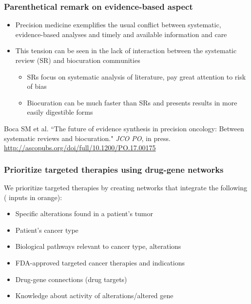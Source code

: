 \documentclass{beamer}
\begin{document}
\begin{frame}[noframenumbering]
\frametitle{Parenthetical remark on evidence-based aspect}

\begin{itemize}
\item Precision medicine exemplifies the usual conflict between systematic, evidence-based analyses and
timely and available information and care
\item This tension can be seen in the lack of interaction between the systematic review (SR) and biocuration communities
\begin{itemize}
\item SRs focus on systematic analysis of literature, pay great attention to risk of bias
\item Biocuration can be much faster than SRs and presents results in more easily digestible forms
\end{itemize}
\end{itemize}

\vspace{0.4cm}

Boca SM et al. ``The future of evidence synthesis in precision oncology: Between systematic reviews and biocuration."
\textit{JCO PO}, in press. \url{http://ascopubs.org/doi/full/10.1200/PO.17.00175}

\end{frame}


\begin{frame}[noframenumbering]
\frametitle{Prioritize targeted therapies using drug-gene networks}

We prioritize targeted therapies by creating networks that integrate the following ({\color{orange} inputs in orange}):

\begin{itemize}
\item {\color{orange}Specific alterations found in a patient's tumor}
\item {\color{orange}Patient's cancer type}
\item Biological pathways relevant to cancer type, alterations
\item FDA-approved targeted cancer therapies and indications
\item Drug-gene connections (drug targets)
\item Knowledge about activity of alterations/altered gene
\end{itemize}

\end{frame}
\end{document}

